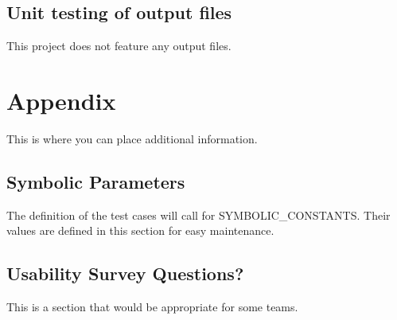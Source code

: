 \documentclass[12pt, titlepage]{article}
\begin{document}
\subsection{Unit testing of output files}		
\par This project does not feature any output files.


\newpage
\section{Appendix}
This is where you can place additional information.
\subsection{Symbolic Parameters}
The definition of the test cases will call for SYMBOLIC\_CONSTANTS.
Their values are defined in this section for easy maintenance.
\subsection{Usability Survey Questions?}
This is a section that would be appropriate for some teams.
\end{document}
